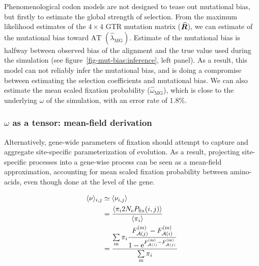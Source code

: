 Phenomenological \gls{codon} models are not designed to tease out mutational bias, but firstly to estimate the global strength of selection.
From the maximum \gls{likelihood} estimates of the $4 \times 4$ GTR mutation matrix ($\widehat{\bm{R}}$), we can estimate of the mutational bias toward $\mathrm{AT}$ $\left({\widehat{\lambda}_{\text{MG}}} \right)$.
Estimate of the mutational bias is halfway between observed bias of the alignment and the true value used during the simulation (see figure~\ref{fig-mut-bias:inference}, left panel).
As a result, this model can not reliably infer the mutational bias, and is doing a compromise between estimating the selection coefficients and mutational bias.
We can also estimate the mean scaled fixation probability (${\widehat{\omega}_{\text{MG}}}$), which is close to the underlying $\omega$ of the simulation, with an error rate of 1.8\%.

\subsubsection{$\omega$ as a tensor: mean-field derivation}

Alternatively, gene-wide parameters of fixation should attempt to capture and aggregate site-specific parameterization of evolution.
As a result, projecting site-specific processes into a gene-wise process can be seen as a mean-field approximation, accounting for mean scaled fixation probability between amino-acids, even though done at the level of the gene.

\begin{align}
\langle \nu \rangle_{{i}, {j}} & \simeq \langle \nu_{{i}, {j}} \rangle \\
                            & = \dfrac{ \langle \pi_{{i}} 2N_{\textrm{e}} P_{\mathrm{fix}}({i}, {j}) \rangle }{ \langle \pi_{{i}} \rangle } \\
                            & = \dfrac{ \sum\limits_{\text{m}}  \pi_{{i}}\dfrac{F_{\mathcal{A}({j})}^{(\text{m})} - F_{\mathcal{A}({i})}^{(\text{m})}}{1 - \mathrm{e}^{F_{\mathcal{A}({i})}^{(\text{m})} - F_{\mathcal{A}({j})}^{(\text{m})}}} }{ \sum\limits_{\text{m}} \pi_{{i}} }
\end{align}

